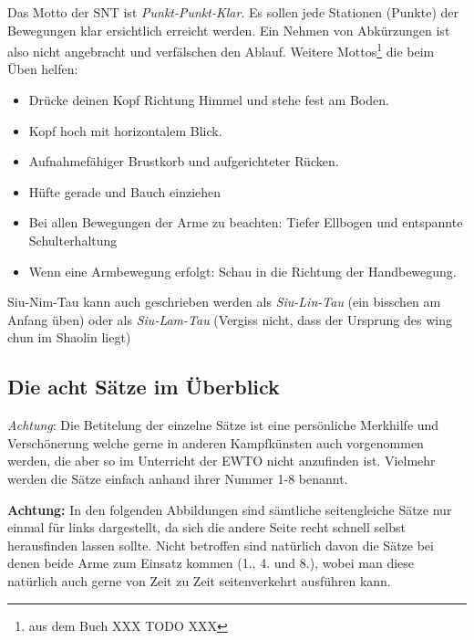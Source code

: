 Das Motto der SNT ist \textit{Punkt-Punkt-Klar}. Es sollen jede Stationen (Punkte) der Bewegungen klar ersichtlich erreicht werden. Ein Nehmen von Abk\"urzungen ist also nicht angebracht und verf\"alschen den Ablauf. Weitere Mottos\footnote{aus dem Buch XXX TODO XXX} die beim \"Uben helfen:

\begin{itemize}
	\item Dr\"ucke deinen Kopf Richtung Himmel und stehe fest am Boden.
	\item Kopf hoch mit horizontalem Blick.
	\item Aufnahmef\"ahiger Brustkorb und aufgerichteter R\"ucken.
	\item H\"ufte gerade und Bauch einziehen
	\item Bei allen Bewegungen der Arme zu beachten: Tiefer Ellbogen und entspannte Schulterhaltung
	\item Wenn eine Armbewegung erfolgt: Schau in die Richtung der Handbewegung.
\end{itemize}

\begin{WTCommonBegriff}
	Siu-Nim-Tau kann auch geschrieben werden als \textit{Siu-Lin-Tau} (ein bisschen am Anfang \"uben) oder als \textit{Siu-Lam-Tau} (Vergiss nicht, dass der Ursprung des wing chun im Shaolin liegt)
\end{WTCommonBegriff}

\subsection*{Die acht S\"atze im \"Uberblick}

\textit{Achtung}: Die Betitelung der einzelne S\"atze ist eine pers\"onliche Merkhilfe und Versch\"onerung welche gerne in anderen Kampfk\"unsten auch vorgenommen werden, die aber so im Unterricht der EWTO nicht anzufinden ist. Vielmehr werden die S\"atze einfach anhand ihrer Nummer 1-8 benannt.


\textbf{Achtung: } In den folgenden Abbildungen sind s\"amtliche seitengleiche S\"atze nur einmal f\"ur links dargestellt, da sich die andere Seite recht schnell selbst herausfinden lassen sollte. Nicht betroffen sind nat\"urlich davon die S\"atze bei denen beide Arme zum Einsatz kommen (1., 4. und 8.), wobei man diese nat\"urlich auch gerne von Zeit zu Zeit seitenverkehrt ausf\"uhren kann.


